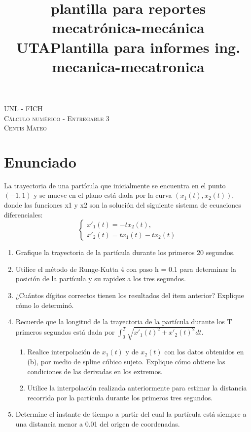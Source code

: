 \documentclass[11pt]{article}
\title{plantilla para reportes mecatrónica-mecánica UTA}
\title{Plantilla para informes ing. mecanica-mecatronica}
\begin{document}

\begin{center}																		%
	\newcommand{\HRule}{\rule{\linewidth}{0.5mm}}									%


	\vspace*{1.0cm}								%
	\textsc{\huge UNL - FICH \vspace{5px}}\\[1.5cm]

	\textsc{\LARGE Cálculo numérico - Entregable 3}\\[1.5cm]													%

	\textsc{\LARGE Centis Mateo}

\end{center}

\section*{Enunciado}
La trayectoria de una partícula que inicialmente se encuentra en el punto
$(-1, 1)$ y se mueve en el plano está dada por la curva $(x_1(t), x_2(t))$, donde las funciones x1 y x2 son la solución del siguiente sistema de ecuaciones diferenciales:
\begin{equation*}
	\left\{
	\begin{array}{ll}
		x'_1(t)=-tx_2(t), \\
		x'_2(t)=tx_1(t)-tx_2(t)
	\end{array}
	\right.
\end{equation*}

\begin{enumerate}[label=(\alph*)]
	\item Grafique la trayectoria de la partícula durante los primeros 20 segundos.
	\item Utilice el método de Runge-Kutta 4 con paso h = 0.1 para determinar la posición de la
	      partícula y su rapidez a los tres segundos.
	\item ¿Cuántos dígitos correctos tienen los resultados del item anterior? Explique cómo lo determinó.
	\item Recuerde que la longitud de la trayectoria de la partícula durante los T primeros segundos
	      está dada por $\int_0^T\sqrt{x'_1(t)^2+x'_2(t)^2}dt$.
	      \begin{enumerate}[label=(\roman*)]
		      \item Realice interpolación de $x_1(t)$ y de $x_2(t)$ con los datos obtenidos en (b), por medio
		            de spline cúbico sujeto. Explique cómo obtiene las condiciones de las derivadas en los
		            extremos.
		      \item Utilice la interpolación realizada anteriormente para estimar la distancia recorrida por
		            la partícula durante los primeros tres segundos.
	      \end{enumerate}
	\item Determine el instante de tiempo a partir del cual la partícula está siempre a una distancia
	      menor a 0.01 del origen de coordenadas.
\end{enumerate}
\end{document}
